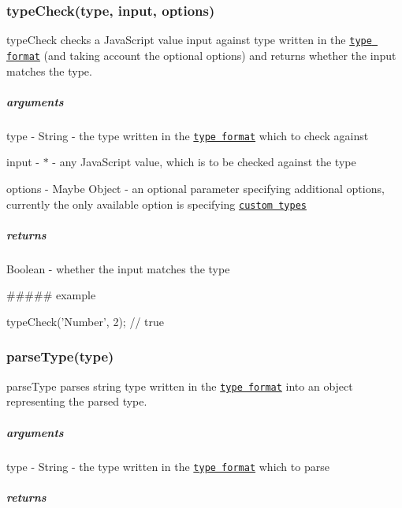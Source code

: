 \subsubsection*{type\+Check(type, input, options)}

{\ttfamily type\+Check} checks a Java\+Script value {\ttfamily input} against {\ttfamily type} written in the \href{#type-format}{\tt type format} (and taking account the optional {\ttfamily options}) and returns whether the {\ttfamily input} matches the {\ttfamily type}.

\subparagraph*{arguments}


\begin{DoxyItemize}
\item type -\/ {\ttfamily String} -\/ the type written in the \href{#type-format}{\tt type format} which to check against
\item input -\/ {\ttfamily $\ast$} -\/ any Java\+Script value, which is to be checked against the type
\item options -\/ {\ttfamily Maybe Object} -\/ an optional parameter specifying additional options, currently the only available option is specifying \href{#custom-types}{\tt custom types}
\end{DoxyItemize}

\subparagraph*{returns}

{\ttfamily Boolean} -\/ whether the input matches the type

\#\#\#\#\# example 
\begin{DoxyCode}
typeCheck(\textcolor{stringliteral}{'Number'}, 2); \textcolor{comment}{// true}
\end{DoxyCode}


\subsubsection*{parse\+Type(type)}

{\ttfamily parse\+Type} parses string {\ttfamily type} written in the \href{#type-format}{\tt type format} into an object representing the parsed type.

\subparagraph*{arguments}


\begin{DoxyItemize}
\item type -\/ {\ttfamily String} -\/ the type written in the \href{#type-format}{\tt type format} which to parse
\end{DoxyItemize}

\subparagraph*{returns}

